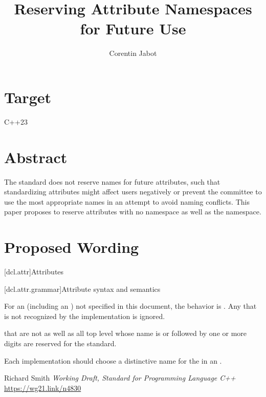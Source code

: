 \documentclass{wg21}
\title{Reserving Attribute Namespaces for Future Use}
\author{Corentin Jabot}{corentin.jabot@gmail.com}
\begin{document}
\maketitle

\section{Target}

C++23

\section{Abstract}

The standard does not reserve names for future attributes, such that standardizing attributes might affect users negatively
or prevent the committee to use the most appropriate names in an attempt to avoid naming conflicts.
This paper proposes to reserve attributes with no namespace as well as the  namespace.

\section{Proposed Wording}

[dcl.attr]{Attributes}%

[dcl.attr.grammar]{Attribute syntax and semantics}

\pnum
For an 
(including an )
not specified in this document, the
behavior is .
Any  that is not recognized by the implementation
is ignored.

\begin{addedblock}
 that are not  as well as all top level  whose name is  or   followed by one or more digits are reserved for the standard.
\end{addedblock}


\begin{note}
	Each implementation should choose a distinctive name for the
	 in an .
\end{note}


 
\begin{thebibliography}{9}
    
    Richard Smith
    \emph{Working Draft, Standard for Programming Language C++}\newline
    \url{https://wg21.link/n4830}
    
\end{thebibliography}
\end{document}

